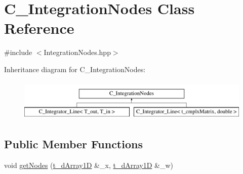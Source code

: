 \hypertarget{class_c___integration_nodes}{\section{C\-\_\-\-Integration\-Nodes Class Reference}
\label{class_c___integration_nodes}
}


{\ttfamily \#include $<$Integration\-Nodes.\-hpp$>$}

Inheritance diagram for C\-\_\-\-Integration\-Nodes\-:\begin{figure}[H]
\begin{center}
\leavevmode
\includegraphics[height=2.000000cm]{class_c___integration_nodes}
\end{center}
\end{figure}
\subsection*{Public Member Functions}
\begin{DoxyCompactItemize}
\item 
void \hyperlink{class_c___integration_nodes_ad63bb8d4226180ecf6332852a52b702b}{get\-Nodes} (\hyperlink{types_8h_a7572e8a35cd6501ce959f177307310a4}{t\-\_\-d\-Array1\-D} \&\-\_\-x, \hyperlink{types_8h_a7572e8a35cd6501ce959f177307310a4}{t\-\_\-d\-Array1\-D} \&\-\_\-w)
\end{DoxyCompactItemize}
